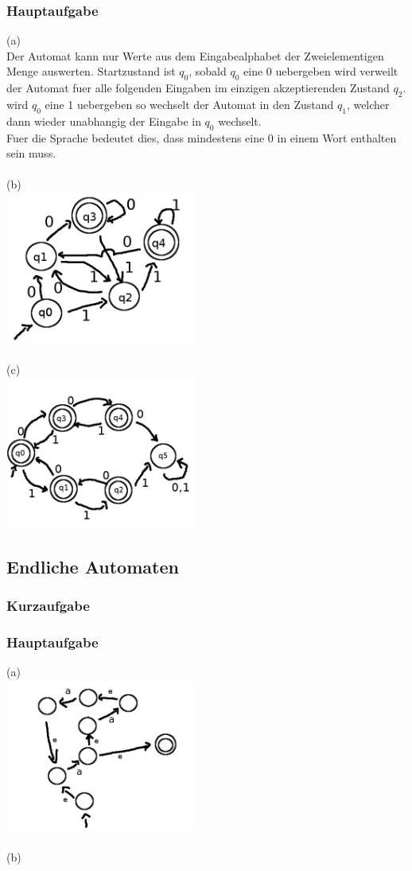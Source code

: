 \documentclass{article}
\begin{document}
\subsubsection{Hauptaufgabe}
(a)\\
Der Automat kann nur Werte aus dem Eingabealphabet der Zweielementigen
Menge auswerten. Startzustand ist $q_0$, sobald $q_0$ eine 0 uebergeben
wird verweilt der Automat fuer alle folgenden Eingaben im einzigen 
akzeptierenden Zustand $q_2$. wird $q_0$ eine 1 uebergeben so wechselt 
der Automat in den Zustand $q_1$, welcher dann wieder unabhangig der 
Eingabe in $q_0$ wechselt.\\
Fuer die Sprache bedeutet dies, dass mindestens eine 0 in einem Wort enthalten
sein muss.\\
\\
(b)\\
\includegraphics[height=5cm]{./UB1/2b.png}\\
\\
(c)\\
\includegraphics[height=5cm]{./UB1/2c.png}\\

\newpage
\subsection{Endliche Automaten}
\subsubsection{Kurzaufgabe}
\subsubsection{Hauptaufgabe}
(a)\\
\includegraphics[height=5cm]{./UB1/3a.png}\\
\\
(b)\\
\end{document}

